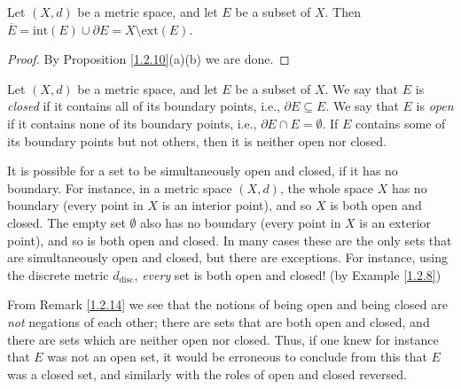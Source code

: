 \begin{corollary}\label{1.2.11}
    Let \((X, d)\) be a metric space, and let \(E\) be a subset of \(X\).
    Then \(\overline{E} = \text{int}(E) \cup \partial E = X \setminus \text{ext}(E)\).
\end{corollary}

\begin{proof}
    By Proposition \ref{1.2.10}(a)(b) we are done.
\end{proof}

\begin{definition}\label{1.2.12}
    Let \((X, d)\) be a metric space, and let \(E\) be a subset of \(X\).
    We say that \(E\) is \emph{closed} if it contains all of its boundary points, i.e., \(\partial E \subseteq E\).
    We say that \(E\) is \emph{open} if it contains none of its boundary points, i.e., \(\partial E \cap E = \emptyset\).
    If \(E\) contains some of its boundary points but not others, then it is neither open nor closed.
\end{definition}

\setcounter{theorem}{13}
\begin{remark}\label{1.2.14}
    It is possible for a set to be simultaneously open and closed, if it has no boundary.
    For instance, in a metric space \((X, d)\), the whole space \(X\) has no boundary (every point in \(X\) is an interior point), and so \(X\) is both open and closed.
    The empty set \(\emptyset\) also has no boundary (every point in \(X\) is an exterior point), and so is both open and closed.
    In many cases these are the only sets that are simultaneously open and closed, but there are exceptions.
    For instance, using the discrete metric \(d_{\text{disc}}\), \emph{every} set is both open and closed! (by Example \ref{1.2.8})
\end{remark}

\begin{note}
    From Remark \ref{1.2.14} we see that the notions of being open and being closed are \emph{not} negations of each other;
    there are sets that are both open and closed, and there are sets which are neither open nor closed.
    Thus, if one knew for instance that \(E\) was not an open set, it would be erroneous to conclude from this that \(E\) was a closed set, and similarly with the roles of open and closed reversed.
\end{note}

